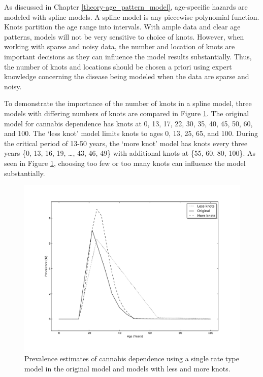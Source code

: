 As discussed in Chapter \ref{theory-age_pattern_model}, age-specific
hazards are modeled with spline models.  A spline model is any
piecewise polynomial function.  Knots partition the age range into
intervals.  With ample data and clear age patterns, models will not be
very sensitive to choice of knots.  However, when working with sparse
and noisy data, the number and location of knots are important
decisions as they can influence the model results substantially.
Thus, the number of knots and locations should be chosen a priori
using expert knowledge concerning the disease being modeled when the
data are sparse and noisy.

To demonstrate the importance of the number of knots in a spline
model, three models with differing numbers of knots are compared in
Figure \ref{fig:app-cannabis_knots}.  The original model for cannabis
dependence has knots at 0, 13, 17, 22, 30, 35, 40, 45, 50, 60, and
100.  The `less knot' model limits knots to ages 0, 13, 25, 65, and
100.  During the critical period of 13-50 years, the `more knot' model
has knots every three years \{0, 13, 16, 19, \ldots, 43, 46, 49\} with
additional knots at \{55, 60, 80, 100\}.  As seen in Figure
\ref{fig:app-cannabis_knots}, choosing too few or too many knots can
influence the model substantially.

    \begin{figure}[h]
        \begin{center}
            \includegraphics[width=\textwidth]{applications/cannabis_dependence-knots.pdf}
            \caption{Prevalence estimates of cannabis dependence using
              a single rate type model in the original model and
              models with less and more knots. }
        \label{fig:app-cannabis_knots}
        \end{center}
    \end{figure}

